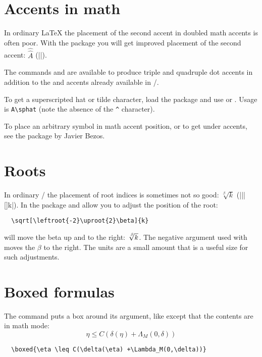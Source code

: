 \documentclass[leqno,titlepage,openany]{amsldoc}[1999/12/13]
\begin{document}
\section{Accents in math}

In ordinary \LaTeX{} the placement of the second accent in doubled math
accents is often poor. With the  package you
will get improved placement of the second accent:
$\hat{\hat{A}}$ (|{}|).

The commands  and  are available to produce triple
and quadruple dot accents in addition to the  and 
accents already available in \latex/.

To get a superscripted hat or tilde character, load the 
package and use  or . Usage is \verb'A\sphat'
(note the absence of the \verb'^' character).

To place an arbitrary symbol in math accent position, or to get under
accents, see the  package by Javier Bezos.

\section{Roots}

In ordinary \latex/ the placement of root indices is sometimes not so
good: $\sqrt[\beta]{k}$ (|\sqrt||[\beta]{k}|).  In the
 package  and  allow you to adjust
the position of the root:
\begin{verbatim}
  \sqrt[\leftroot{-2}\uproot{2}\beta]{k}
\end{verbatim}
will move the beta up and to the right:
$\sqrt[\leftroot{-2}\uproot{2}\beta]{k}$. The negative argument used
with  moves the $\beta$ to the right. The units are a small
amount that is a useful size for such adjustments.

\section{Boxed formulas}

The command  puts a box around its
argument, like  except that the contents are in math mode:
\begin{equation}
\boxed{\eta \leq C(\delta(\eta) +\Lambda_M(0,\delta))}
\end{equation}
\begin{verbatim}
  \boxed{\eta \leq C(\delta(\eta) +\Lambda_M(0,\delta))}
\end{verbatim}
\end{document}
